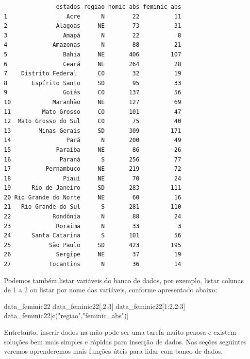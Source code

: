 \documentclass[
  letterpaper,
  DIV=11,
  numbers=noendperiod]{scrreprt}
\newenvironment{Shaded}{\begin{snugshade}}{\end{snugshade}}
\newcommand{\DecValTok}[1]{\textcolor[rgb]{0.68,0.00,0.00}{#1}}
\newcommand{\FunctionTok}[1]{\textcolor[rgb]{0.28,0.35,0.67}{#1}}
\newcommand{\NormalTok}[1]{\textcolor[rgb]{0.00,0.23,0.31}{#1}}
\newcommand{\SpecialCharTok}[1]{\textcolor[rgb]{0.37,0.37,0.37}{#1}}
\newcommand{\StringTok}[1]{\textcolor[rgb]{0.13,0.47,0.30}{#1}}
\begin{document}
\begin{verbatim}
               estados regiao homic_abs feminic_abs
1                 Acre      N        22          11
2              Alagoas     NE        73          31
3                Amapá      N        22           8
4             Amazonas      N        88          21
5                Bahia     NE       406         107
6                Ceará     NE       264          28
7    Distrito Federal      CO        32          19
8       Espírito Santo     SD        95          33
9                Goiás     CO       137          56
10            Maranhão     NE       127          69
11         Mato Grosso     CO       101          47
12  Mato Grosso do Sul     CO        75          40
13        Minas Gerais     SD       309         171
14                Pará      N       200          49
15             Paraíba     NE        86          26
16              Paraná      S       256          77
17          Pernambuco     NE       219          72
18               Piauí     NE        70          24
19      Rio de Janeiro     SD       283         111
20 Rio Grande do Norte     NE        60          16
21   Rio Grande do Sul      S       281         110
22            Rondônia      N        88          24
23             Roraima      N        33           3
24      Santa Catarina      S       101          56
25           São Paulo     SD       423         195
26             Sergipe     NE        37          19
27           Tocantins      N        36          14
\end{verbatim}

Podemos também listar variáveis do banco de dados, por exemplo, listar
colunas de 1 a 2 ou listar por nome das variáveis, conforme apresentado
abaixo:

\begin{Shaded}
\begin{Highlighting}[]
\NormalTok{data\_feminic22}
\NormalTok{data\_feminic22[,}\DecValTok{2}\SpecialCharTok{:}\DecValTok{3}\NormalTok{]}
\NormalTok{data\_feminic22[}\DecValTok{1}\SpecialCharTok{:}\DecValTok{2}\NormalTok{,}\DecValTok{2}\SpecialCharTok{:}\DecValTok{3}\NormalTok{]}
\NormalTok{data\_feminic22[}\FunctionTok{c}\NormalTok{(}\StringTok{"regiao"}\NormalTok{,}\StringTok{"feminic\_abs"}\NormalTok{)]}
\end{Highlighting}
\end{Shaded}

Entretanto, inserir dados na mão pode ser uma tarefa muito penosa e
existem soluções bem mais simples e rápidas para inserção de dados. Nas
seções seguintes veremos aprenderemos mais funções úteis para lidar com
banco de dados.
\end{document}
